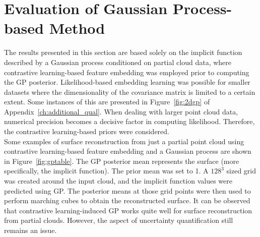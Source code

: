 \section{Evaluation of Gaussian Process-based Method}
The results presented in this section are based solely on the implicit function described by a Gaussian process conditioned on partial cloud data, where contrastive learning-based feature embedding was employed prior to computing the GP posterior. Likelihood-based embedding learning was possible for smaller datasets where the dimensionality of the covariance matrix is limited to a certain extent. Some instances of this are presented in Figure~\ref{fig:2dgp} of Appendix~\ref{ch:additional_qual}. When dealing with larger point cloud data, numerical precision becomes a decisive factor in computing likelihood. Therefore, the contrastive learning-based priors were considered.
\\
Some examples of surface reconstruction from just a partial point cloud using contrastive learning-based feature embedding and a Gaussian process are shown in Figure~\ref{fig:gptable}. The GP posterior mean represents the surface (more specifically, the implicit function). The prior mean was set to 1. A $128^3$ sized grid was created around the input cloud, and the implicit function values were predicted using GP. The posterior means at those grid points were then used to perform marching cubes to obtain the reconstructed surface. It can be observed that contrastive learning-induced GP works quite well for surface reconstruction from partial clouds. However, the aspect of uncertainty quantification still remains an issue.   
